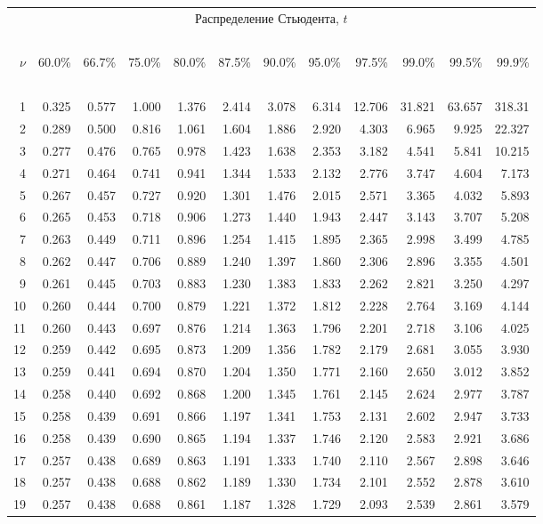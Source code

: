 {\begin{center}
\begin{tabular}
      {r@{\quad}r@{\,}r@{\,}r@{\,}r@{\,}r@{\,}r@{\,}r@{\,}r@{\,}r@{\,}r@{\,}r}
\multicolumn{12}{c}{Распределение Стьюдента, $t$} \\
\ \\
$\nu$&60.0\%&66.7\%&75.0\%&80.0\%&87.5\%&90.0\%&95.0\%&97.5\%&99.0\%&99.5\%
     &99.9\% \\
\ \\
 1&0.325&0.577&1.000&1.376&2.414&3.078&6.314&12.706&31.821&63.657&318.31 \\
 2&0.289&0.500&0.816&1.061&1.604&1.886&2.920&4.303&6.965&9.925&22.327 \\
 3&0.277&0.476&0.765&0.978&1.423&1.638&2.353&3.182&4.541&5.841&10.215 \\
 4&0.271&0.464&0.741&0.941&1.344&1.533&2.132&2.776&3.747&4.604&7.173 \\
 5&0.267&0.457&0.727&0.920&1.301&1.476&2.015&2.571&3.365&4.032&5.893 \\
 6&0.265&0.453&0.718&0.906&1.273&1.440&1.943&2.447&3.143&3.707&5.208 \\
 7&0.263&0.449&0.711&0.896&1.254&1.415&1.895&2.365&2.998&3.499&4.785 \\
 8&0.262&0.447&0.706&0.889&1.240&1.397&1.860&2.306&2.896&3.355&4.501 \\
 9&0.261&0.445&0.703&0.883&1.230&1.383&1.833&2.262&2.821&3.250&4.297 \\
10&0.260&0.444&0.700&0.879&1.221&1.372&1.812&2.228&2.764&3.169&4.144 \\
11&0.260&0.443&0.697&0.876&1.214&1.363&1.796&2.201&2.718&3.106&4.025 \\
12&0.259&0.442&0.695&0.873&1.209&1.356&1.782&2.179&2.681&3.055&3.930 \\
13&0.259&0.441&0.694&0.870&1.204&1.350&1.771&2.160&2.650&3.012&3.852 \\
14&0.258&0.440&0.692&0.868&1.200&1.345&1.761&2.145&2.624&2.977&3.787 \\
15&0.258&0.439&0.691&0.866&1.197&1.341&1.753&2.131&2.602&2.947&3.733 \\
16&0.258&0.439&0.690&0.865&1.194&1.337&1.746&2.120&2.583&2.921&3.686 \\
17&0.257&0.438&0.689&0.863&1.191&1.333&1.740&2.110&2.567&2.898&3.646 \\
18&0.257&0.438&0.688&0.862&1.189&1.330&1.734&2.101&2.552&2.878&3.610 \\
19&0.257&0.438&0.688&0.861&1.187&1.328&1.729&2.093&2.539&2.861&3.579 \\

\end{tabular}
\end{center}}
